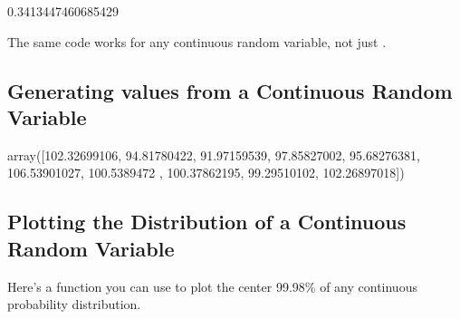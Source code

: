 \documentclass[letterpaper,10pt,english]{sphinxmanual}
\begin{document}
\begin{sphinxVerbatim}[commandchars=\\\{\}]
0.3413447460685429
\end{sphinxVerbatim}

The same code works for any continuous random variable, not just .


\subsection{Generating values from a Continuous Random Variable}
\label{\detokenize{GB213-review-in-Python:generating-values-from-a-continuous-random-variable}}
\begin{sphinxVerbatim}[commandchars=\\\{\}]
    
\end{sphinxVerbatim}

\begin{sphinxVerbatim}[commandchars=\\\{\}]
array([102.32699106,  94.81780422,  91.97159539,  97.85827002,
        95.68276381, 106.53901027, 100.5389472 , 100.37862195,
        99.29510102, 102.26897018])
\end{sphinxVerbatim}


\subsection{Plotting the Distribution of a Continuous Random Variable}
\label{\detokenize{GB213-review-in-Python:plotting-the-distribution-of-a-continuous-random-variable}}
Here’s a function you can use to plot the center 99.98\% of any continuous probability distribution.

\begin{sphinxVerbatim}[commandchars=\\\{\}]
    
            
          
        
       
\end{sphinxVerbatim}
\end{document}
